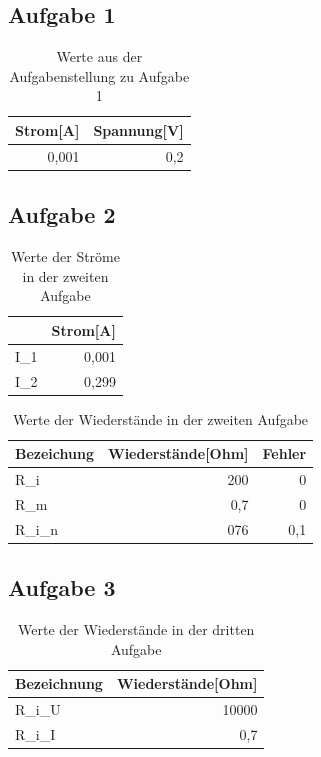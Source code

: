 \documentclass[12pt]{scrartcl}
\begin{document}
\newpage

\subsection{Aufgabe 1}
\begin{table}[htbp]
\caption{Werte aus der Aufgabenstellung zu Aufgabe 1}
\begin{tabular}{|l|l|}
\hline
Strom[A] & Spannung[V] \\ \hline
\multicolumn{1}{|r|}{0,001} & \multicolumn{1}{r|}{0,2} \\ \hline
\end{tabular}
\label{aufgabe_1_grundwerte}
\end{table}


\subsection{Aufgabe 2}
\begin{table}[htbp]
\caption{Werte der Ströme in der zweiten Aufgabe}
\begin{tabular}{|l|r|}
\hline
 & \multicolumn{1}{l|}{Strom[A]} \\ \hline
I\_1 & 0,001 \\ \hline
I\_2 & 0,299 \\ \hline
\end{tabular}
\label{aufgabe_2_strom}
\end{table}

\begin{table}[htbp]
\caption{Werte der Wiederstände in der zweiten Aufgabe}
\begin{tabular}{|l|r|r|}
\hline
Bezeichung & \multicolumn{1}{l|}{Wiederstände[Ohm]} & \multicolumn{1}{l|}{Fehler} \\ \hline
R\_i & 200 & 0 \\ \hline
R\_m & 0,7 & 0 \\ \hline
R\_i\_n & 076 & 0,1 \\ \hline
\end{tabular}
\label{aufgabe_2_Wiederstände}
\end{table}

\newpage

\subsection{Aufgabe 3}

\begin{table}[htbp]
\caption{Werte der Wiederstände in der dritten Aufgabe}
\begin{tabular}{|l|r|}
\hline
Bezeichnung & \multicolumn{1}{l|}{Wiederstände[Ohm]} \\ \hline
R\_i\_U & 10000 \\ \hline
R\_i\_I & 0,7 \\ \hline
\end{tabular}
\label{aufgabe_3_Wiederstände}
\end{table}
\end{document}
